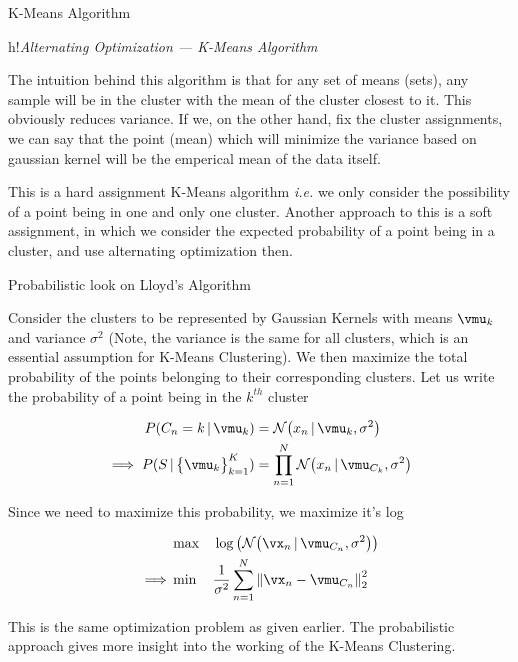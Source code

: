 \documentclass{article}
\begin{document}
\begin{ssection}{K-Means Algorithm}
\begin{salgorithm}[0.9\textwidth]{h!}{\textit{Alternating Optimization --- K-Means Algorithm}}
    \end{salgorithm}

    The intuition behind this algorithm is that for any set of means (sets), any sample will be in the cluster with the mean of the cluster closest to it. This obviously reduces variance. If we, on the other hand, fix the cluster assignments, we can say that the point (mean) which will minimize the variance based on gaussian kernel will be the emperical mean of the data itself. \br%

    This is a hard assignment K-Means algorithm \textit{i.e.} we only consider the possibility of a point being in one and only one cluster. Another approach to this is a soft assignment, in which we consider the expected probability of a point being in a cluster, and use alternating optimization then.

\end{ssection}

\begin{ssection}{Probabilistic look on Lloyd's Algorithm}

    Consider the clusters to be represented by Gaussian Kernels with means $\vmu_k$ and variance $\sigma^2$ (Note, the variance is the same for all clusters, which is an essential assumption for K-Means Clustering). We then maximize the total probability of the points belonging to their corresponding clusters. Let us write the probability of a point being in the $k^{th}$ cluster
    
    \begin{align*}
        P(C_n = k \pipe \vmu_k)                         &= \ND{x_n \pipe \vmu_k, \sigma^2} \\
        \implies P(S \pipe \bset{\vmu_k}_{k = 1}^{K})   &= \prod_{n = 1}^{N} \ND{x_n \pipe \vmu_{C_k}, \sigma^2}
    \end{align*} \br%

    Since we need to maximize this probability, we maximize it's log

    \begin{align*}
        \,          &\max \quad \log\bpara{\ND{\vx_n \pipe \vmu_{C_n}, \sigma^2}} \\
        \implies    &\min \quad \frac{1}{\sigma^2} \sum_{n = 1}^{N} \norm{\vx_n - \vmu_{C_n}}_2^2
    \end{align*}

    This is the same optimization problem as given earlier. The probabilistic approach gives more insight into the working of the K-Means Clustering.
    
\end{ssection}
\end{document}
